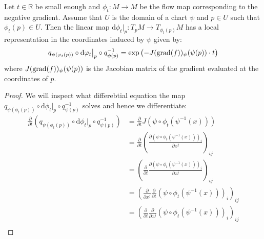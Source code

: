 \begin{lemma}
	Let $t\in \mathbb{R}$ be small enough and $\phi_t: M\to M$ be the flow map corresponding to the negative gradient. Assume that $U$ is the domain of a chart $\psi$ and $p\in U$ such that $\phi_t(p)\in U$. Then the linear map $\mathrm{d} \phi_t \big|_p: T_pM\to T_{\phi_t(p)}M$ has a local representation in the coordinates induced by $\psi$ given by:
	\[
	q_{\psi(\varphi_t(p))} \circ \mathrm{d} \varphi_t \big|_p \circ q_{\psi(p)}^{-1} = \exp\left(-J(\mathrm{grad}(f))_\psi(\psi(p)) \cdot t\right)
	\]
	where $J(\mathrm{grad}(f))_\psi(\psi(p))$ is the Jacobian matrix of the gradient evaluated at the coordinates of $p$.
\end{lemma}
\begin{proof}
We will inspect what differebtial equation the map $	q_{\psi(\phi_t(p))} \circ \mathrm{d} \phi_t \big|_p \circ q_{\psi(p)}^{-1}$ solves and hence we differentiate:
\begin{align*}
	\frac{\partial}{\partial t}	\left( q_{\psi(\phi_t(p))} \circ \mathrm{d} \phi_t \big|_p \circ q_{\psi(p)}^{-1} \right) 
	&= 	\frac{\partial}{\partial t} J(\psi \circ \phi_t (\psi^{-1}(x)))\\
	&= 	\frac{\partial}{\partial t} \left(\frac{\partial \left(\psi \circ \phi_t (\psi^{-1}(x))\right)_i}{\partial x^j}\right)_{ij}\\
    &=	 \left(\frac{\partial}{\partial t} \frac{\partial \left(\psi \circ \phi_t (\psi^{-1}(x))\right)_i}{\partial x^j}\right)_{ij}\\
    &=	 \left(\frac{\partial}{\partial x^j}\frac{\partial}{\partial t}  \left(\psi \circ \phi_t (\psi^{-1}(x))\right)_i\right)_{ij}\\
    &=	 \left(\frac{\partial}{\partial t}\frac{\partial}{\partial  x^j}  \left(\psi \circ \phi_t (\psi^{-1}(x))\right)_i\right)_{ij}\\
\end{align*}
\end{proof}













